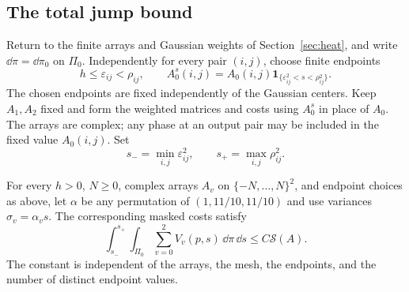 \subsection{The total jump bound}

Return to the finite arrays and Gaussian weights of
Section~\ref{sec:heat}, and write $\dd\pi=\dd\pi_0$ on $\Pi_0$.
Independently for every pair $(i,j)$, choose
finite endpoints
\[
 h\le\varepsilon_{ij}<\rho_{ij},
 \qquad
 A_0^s(i,j)=A_0(i,j)
       \mathbf1_{\{\varepsilon_{ij}^2<s<\rho_{ij}^2\}}.
\]
The chosen endpoints are fixed independently of the Gaussian centers.
Keep $A_1,A_2$ fixed and form the weighted matrices and costs using
$A_0^s$ in place of $A_0$.  The arrays are complex; any phase at an
output pair may be included in the fixed value $A_0(i,j)$.
Set
\[
 s_- =\min_{i,j}\varepsilon_{ij}^2,
 \qquad s_+=\max_{i,j}\rho_{ij}^2.
\]

\begin{proposition}
\label{prop:masked-dissipation}
For every $h>0$, $N\ge0$, complex arrays $A_v$ on
$\{-N,\ldots,N\}^2$, and endpoint choices as above, let
$\alpha$ be any permutation of $(1,11/10,11/10)$ and use variances
$\sigma_v=\alpha_vs$.  The corresponding masked costs satisfy
\begin{equation}\label{eq:masked-dissipation}
 \int_{s_-}^{s_+}\int_{\Pi_0}
       \sum_{v=0}^2 V_v(p,s)\,\dd\pi\,\dd s
 \le C\mathcal S(A).
\end{equation}
The constant is independent of the arrays, the mesh, the endpoints,
and the number of distinct endpoint values.
\end{proposition}

